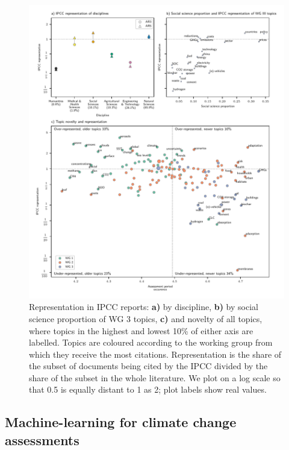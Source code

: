 \documentclass{article}
\begin{document}
\begin{linenumbers}
		\begin{figure}[htp]
			\begin{center}
				\includegraphics[width=180mm]{../plots_pub/big_panel_representation.pdf}
				\caption{Representation in IPCC reports: \textbf{a)} by discipline, \textbf{b)} by social science proportion of WG 3 topics, \textbf{c)} and novelty of all topics, where topics in the highest and lowest 10\% of either axis are labelled. Topics are coloured according to the working group from which they receive the most citations. Representation is the share of the subset of documents being cited by the IPCC divided by the share of the subset in the whole literature. We plot on a log scale so that 0.5 is equally distant to 1 as 2; plot labels show real values.}
				\label{oecd_rep}
			\end{center}
		\end{figure}
		
		
		\subsection*{Machine-learning for climate change assessments}
		

\end{linenumbers}
\end{document}
